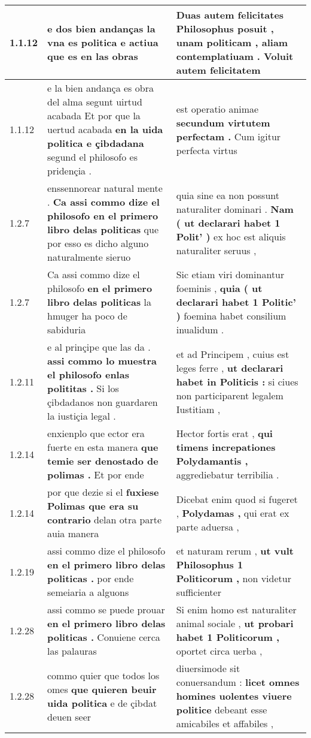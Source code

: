 \begin{tabular}{|p{1cm}|p{6.5cm}|p{6.5cm}|}
1.1.12 & e dos bien andanças \textbf{ la vna es politica e actiua } que es en las obras & Duas autem felicitates Philosophus posuit , \textbf{ unam politicam , aliam contemplatiuam . } Voluit autem felicitatem \\\hline
1.1.12 & e la bien andança es obra del alma segunt uirtud acabada Et por que la uertud acabada \textbf{ en la uida politica e çibdadana } segund el philosofo es pridençia . & est operatio animae \textbf{ secundum virtutem perfectam . } Cum igitur perfecta virtus \\\hline
1.2.7 & enssennorear natural mente . \textbf{ Ca assi commo dize el philosofo en el primero libro delas politicas } que por esso es dicho alguno naturalmente sieruo & quia sine ea non possunt naturaliter dominari . \textbf{ Nam ( ut declarari habet 1 Polit’ ) } ex hoc est aliquis naturaliter seruus , \\\hline
1.2.7 & Ca assi commo dize el philosofo \textbf{ en el primero libro delas politicas } la hmuger ha poco de sabiduria & Sic etiam viri dominantur foeminis , \textbf{ quia ( ut declarari habet 1 Politic’ ) } foemina habet consilium inualidum . \\\hline
1.2.11 & e al prinçipe que las da . \textbf{ assi commo lo muestra el philosofo enlas polititas . } Si los çibdadanos non guardaren la iustiçia legal . & et ad Principem , cuius est leges ferre , \textbf{ ut declarari habet in Politicis : } si ciues non participarent legalem Iustitiam , \\\hline
1.2.14 & enxienplo que ector era fuerte en esta manera \textbf{ que temie ser denostado de polimas . } Et por ende & Hector fortis erat , \textbf{ qui timens increpationes Polydamantis , } aggrediebatur terribilia . \\\hline
1.2.14 & por que dezie si el \textbf{ fuxiese Polimas que era su contrario } delan otra parte auia manera & Dicebat enim quod si fugeret , \textbf{ Polydamas , } qui erat ex parte aduersa , \\\hline
1.2.19 & assi commo dize el philosofo \textbf{ en el primero libro delas politicas . } por ende semeiaria a alguons & et naturam rerum , \textbf{ ut vult Philosophus 1 Politicorum , } non videtur sufficienter \\\hline
1.2.28 & assi commo se puede prouar \textbf{ en el primero libro delas politicas . } Conuiene cerca las palauras & Si enim homo est naturaliter animal sociale , \textbf{ ut probari habet 1 Politicorum , } oportet circa uerba , \\\hline
1.2.28 & commo quier que todos los omes \textbf{ que quieren beuir uida politica } e de çibdat deuen seer & diuersimode sit conuersandum : \textbf{ licet omnes homines uolentes viuere politice } debeant esse amicabiles et affabiles , \\\hline

\end{tabular}
